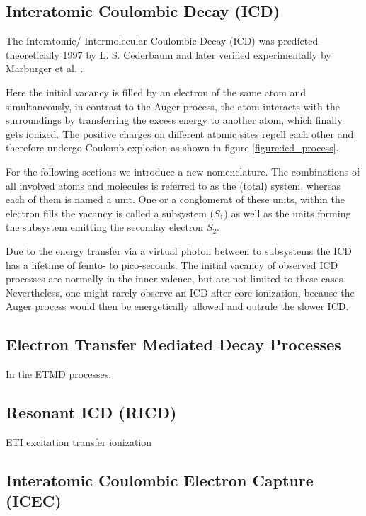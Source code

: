 \subsection{Interatomic Coulombic Decay (ICD)}
The Interatomic/ Intermolecular Coulombic Decay (ICD) was predicted
theoretically 1997 by L. S. Cederbaum \cite{Cederbaum97}
and later verified experimentally by Marburger et al. \cite{Marbuger03}.

Here the initial vacancy is filled by an electron of the same atom and simultaneously,
in contrast to the Auger process, the atom interacts with the surroundings by
transferring the excess energy to another atom, which finally gets ionized. The
positive charges on different atomic sites repell each other and therefore undergo
Coulomb explosion as shown in figure \ref{figure:icd_process}.

\begin{figure}
\end{figure}

For the following sections we introduce a new nomenclature. The combinations
of all involved atoms and molecules is referred to as the (total) system, whereas
each of them is named a unit. One or a conglomerat of these units, within
the electron fills the vacancy is called a subsystem ($S_1$) as well as the units
forming the 
subsystem emitting the seconday electron $S_2$.

Due to the energy transfer via a virtual photon between to subsystems
the ICD has a lifetime of femto- to pico-seconds.
The initial vacancy of observed ICD processes are normally in the inner-valence,
but are not limited to these cases. Nevertheless, one might rarely observe
an ICD after core ionization, because the Auger process would then be energetically
allowed and outrule the slower ICD.



\subsection{Electron Transfer Mediated Decay Processes}
In the \ac{ETMD} processes.

\subsection{Resonant ICD (RICD)}
ETI excitation transfer ionization
\subsection{Interatomic Coulombic Electron Capture (ICEC)}
